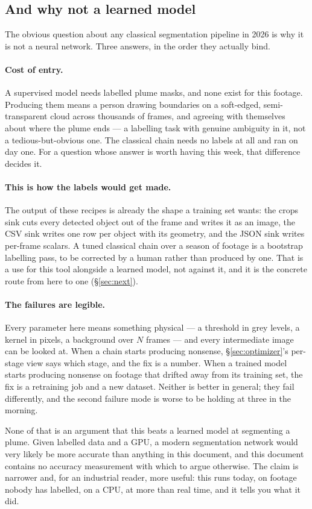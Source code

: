 \subsection{And why not a learned model}

The obvious question about any classical segmentation pipeline in 2026 is why it
is not a neural network. Three answers, in the order they actually bind.

\paragraph{Cost of entry.} A supervised model needs labelled plume masks, and
none exist for this footage. Producing them means a person drawing boundaries on
a soft-edged, semi-transparent cloud across thousands of frames, and agreeing
with themselves about where the plume ends --- a labelling task with genuine
ambiguity in it, not a tedious-but-obvious one. The classical chain needs no
labels at all and ran on day one. For a question whose answer is worth having
this week, that difference decides it.

\paragraph{This is how the labels would get made.} The output of these recipes is
already the shape a training set wants: the crops sink cuts every detected object
out of the frame and writes it as an image, the CSV sink writes one row per object
with its geometry, and the JSON sink writes per-frame scalars. A tuned classical
chain over a season of footage is a bootstrap labelling pass, to be corrected by a
human rather than produced by one. That is a use for this tool alongside a learned
model, not against it, and it is the concrete route from here to one
(§\ref{sec:next}).

\paragraph{The failures are legible.} Every parameter here means something
physical --- a threshold in grey levels, a kernel in pixels, a background over
$N$ frames --- and every intermediate image can be looked at. When a chain starts
producing nonsense, §\ref{sec:optimizer}'s per-stage view says which stage, and
the fix is a number. When a trained model starts producing nonsense on footage
that drifted away from its training set, the fix is a retraining job and a new
dataset. Neither is better in general; they fail differently, and the second
failure mode is worse to be holding at three in the morning.

None of that is an argument that this beats a learned model at segmenting a
plume. Given labelled data and a GPU, a modern segmentation network would very
likely be more accurate than anything in this document, and this document
contains no accuracy measurement with which to argue otherwise. The claim is
narrower and, for an industrial reader, more useful: this runs today, on footage
nobody has labelled, on a CPU, at more than real time, and it tells you what it
did.

\clearpage

